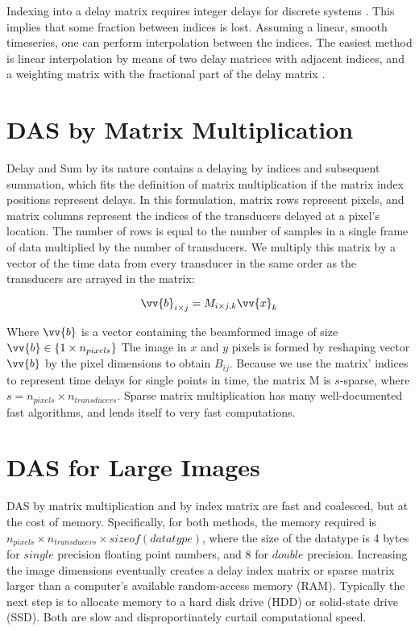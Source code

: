     Indexing into a delay matrix requires integer delays for discrete systems \cite{burger2013principles}. This implies that some fraction between indices is lost. Assuming a linear, smooth timeseries, one can perform interpolation between the indices. The easiest method is linear interpolation by means of two delay matrices with adjacent indices, and a weighting matrix with the fractional part of the delay matrix \cite{perrotYouThinkYou2021a}.

\section{DAS by Matrix Multiplication}
\label{chapter2:mmult_das}

    Delay and Sum by its nature contains a delaying by indices and subsequent summation, which fits the definition of matrix multiplication if the matrix index positions represent delays\cite{6841027}. In this formulation, matrix rows represent pixels, and matrix columns represent the indices of the transducers delayed at a pixel's location. The number of rows is equal to the number of samples in a single frame of data multiplied by the number of transducers. We multiply this matrix by a vector of the time data from every transducer in the same order as the transducers are arrayed in the matrix:

    \begin{equation}
        \vv{b}_{i \times j} = M_{i\times j, k}\vv{x}_{k}
    \end{equation}

    Where $\vv{b}$ is a vector containing the beamformed image of size $\vv{b} \in \{1 \times n_{pixels}\}$ The image in $x$ and $y$ pixels is formed by reshaping vector $\vv{b}$ by the pixel dimensions to obtain $B_{ij}$. Because we use the matrix' indices to represent time delays for single points in time, the matrix M is $s$-sparse, where $s = n_{pixels}\times n_{transducers}$. Sparse matrix multiplication has many well-documented fast algorithms, and lends itself to very fast computations\cite{gilbertSparseMatricesMATLAB1992}.

\section{DAS for Large Images}
\label{chapter2:large_images}

    DAS by matrix multiplication and by index matrix are fast and coalesced, but at the cost of memory. Specifically, for both methods, the memory required is $n_{pixels}\times n_{transducers} \times sizeof(datatype)$, where the size of the datatype is 4 bytes for $single$ precision floating point numbers, and 8 for $double$ precision. Increasing the image dimensions eventually creates a delay index matrix or sparse matrix larger than a computer's available random-access memory (RAM). Typically the next step is to allocate memory to a hard disk drive (HDD) or solid-state drive (SSD). Both are slow and disproportinately curtail computational speed.

